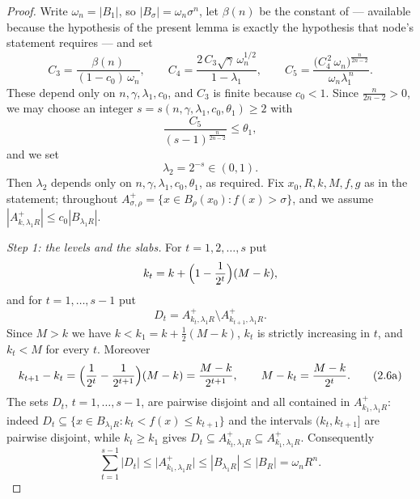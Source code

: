 \begin{proof}
Write $\omega_n=|B_1|$, so $|B_\sigma|=\omega_n\sigma^n$, let $\beta(n)$ be the
constant of  --- available because the
hypothesis  of the present lemma is exactly the
hypothesis that node's statement requires --- and set
\[
C_3=\frac{\beta(n)}{(1-c_0)\,\omega_n},\qquad
C_4=\frac{2\,C_3\sqrt{\gamma}\,\omega_n^{1/2}}{1-\lambda_1},\qquad
C_5=\frac{\bigl(C_4^{\,2}\,\omega_n\bigr)^{\frac n{2n-2}}}{\omega_n\lambda_1^{\,n}} .
\]
These depend only on $n,\gamma,\lambda_1,c_0$, and $C_3$ is finite because
$c_0<1$.  Since $\frac n{2n-2}>0$, we may choose an integer
$s=s(n,\gamma,\lambda_1,c_0,\theta_1)\ge2$ with
\[
\frac{C_5}{(s-1)^{\frac n{2n-2}}}\le\theta_1 ,
\tag{2.10a}
\]
and we set
\[
\lambda_2=2^{-s}\in(0,1) .
\]
Then $\lambda_2$ depends only on $n,\gamma,\lambda_1,c_0,\theta_1$, as required.
Fix $x_0,R,k,M,f,g$ as in the statement; throughout
$A^+_{\sigma,\rho}=\{x\in B_\rho(x_0):f(x)>\sigma\}$, and we assume
$|A^+_{k,\lambda_1R}|\le c_0|B_{\lambda_1R}|$.

\emph{Step 1: the levels and the slabs.}  For $t=1,2,\dots,s$ put
\[
k_t=k+\Bigl(1-\frac1{2^{t}}\Bigr)(M-k) ,
\]
and for $t=1,\dots,s-1$ put
\[
D_t=A^+_{k_t,\lambda_1R}\setminus A^+_{k_{t+1},\lambda_1R} .
\]
Since $M>k$ we have $k<k_1=k+\frac12(M-k)$, $k_t$ is strictly increasing in $t$,
and $k_t<M$ for every $t$.  Moreover
\[
k_{t+1}-k_t=\Bigl(\frac1{2^{t}}-\frac1{2^{t+1}}\Bigr)(M-k)=\frac{M-k}{2^{t+1}},
\qquad
M-k_t=\frac{M-k}{2^{t}} .
\tag{2.6a}
\]
The sets $D_t$, $t=1,\dots,s-1$, are pairwise disjoint and all contained in
$A^+_{k_1,\lambda_1R}$: indeed $D_t\subseteq\{x\in B_{\lambda_1R}:k_t<f(x)\le
k_{t+1}\}$ and the intervals $(k_t,k_{t+1}]$ are pairwise disjoint, while
$k_t\ge k_1$ gives $D_t\subseteq A^+_{k_t,\lambda_1R}\subseteq A^+_{k_1,\lambda_1R}$.
Consequently
\[
\sum_{t=1}^{s-1}|D_t|\le\bigl|A^+_{k_1,\lambda_1R}\bigr|\le|B_{\lambda_1R}|\le|B_R|
=\omega_nR^n .
\tag{2.6b}
\]


\end{proof}
